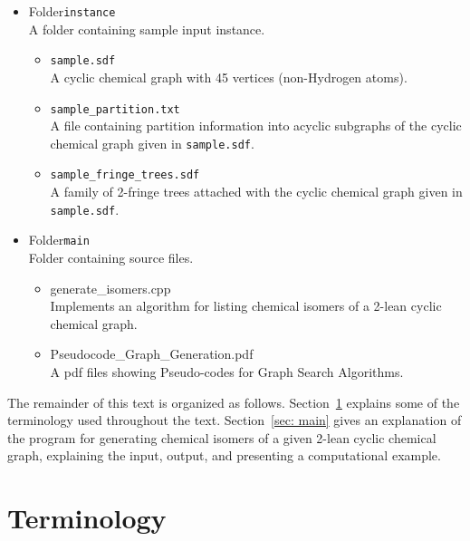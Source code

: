 \documentclass[11pt,titlepage,dvipdfmx,twoside]{article}
\begin{document}
\begin{itemize}
\begin{itemize}
\begin{itemize}
		\end{itemize}
	\item Folder{\tt instance}\\
		A folder containing sample input instance.
		\begin{itemize}
			\item{\tt sample.sdf}\\
			  A cyclic chemical graph with 45 vertices 
			  (non-Hydrogen atoms).
			\item{\tt sample\_partition.txt}\\
			  A file containing partition information into acyclic
			   subgraphs 
				of the cyclic chemical graph given in {\tt sample.sdf}.
			\item{\tt sample\_fringe\_trees.sdf}\\
			 	 A family of 2-fringe trees attached with the cyclic 
			 	 chemical graph given in {\tt sample.sdf}.
		\end{itemize}
	\item Folder{\tt main}\\
		Folder containing source files.
		\begin{itemize}
				
			\item{generate\_isomers.cpp}\\
				Implements an algorithm for listing chemical 
				isomers of
				a 2-lean cyclic chemical graph.
			
			\item{Pseudocode\_Graph\_Generation.pdf}\\
			  A pdf files showing Pseudo-codes for Graph Search Algorithms.
		\end{itemize}

	\end{itemize}
\end{itemize}

The remainder of this text is organized as follows.
Section~\ref{sec:term} explains some of the terminology used throughout the text.
Section~\ref{sec: main}
gives an explanation of the program for generating chemical isomers of
a given 2-lean cyclic chemical graph, explaining the input, output, and
presenting a computational example.



\section{Terminology}
\label{sec:term}
\end{document}
